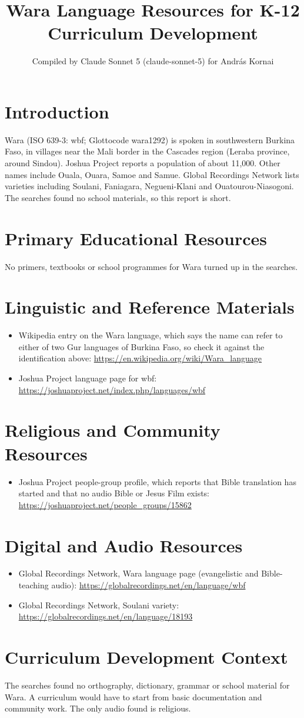 \documentclass[12pt]{article}
\title{Wara Language Resources for K-12 Curriculum Development}
\author{Compiled by Claude Sonnet 5 (claude-sonnet-5) for Andr\'as Kornai}
\date{}
\begin{document}
\maketitle

\section{Introduction}
Wara (ISO 639-3: wbf; Glottocode wara1292) is spoken in southwestern Burkina Faso, in villages near the Mali border in the Cascades region (Leraba province, around Sindou). Joshua Project reports a population of about 11,000. Other names include Ouala, Ouara, Samoe and Samue. Global Recordings Network lists varieties including Soulani, Faniagara, Negueni-Klani and Ouatourou-Niasogoni. The searches found no school materials, so this report is short.

\section{Primary Educational Resources}
No primers, textbooks or school programmes for Wara turned up in the searches.

\section{Linguistic and Reference Materials}
\begin{itemize}
\item Wikipedia entry on the Wara language, which says the name can refer to either of two Gur languages of Burkina Faso, so check it against the identification above: \url{https://en.wikipedia.org/wiki/Wara_language}
\item Joshua Project language page for wbf: \url{https://joshuaproject.net/index.php/languages/wbf}
\end{itemize}

\section{Religious and Community Resources}
\begin{itemize}
\item Joshua Project people-group profile, which reports that Bible translation has started and that no audio Bible or Jesus Film exists: \url{https://joshuaproject.net/people_groups/15862}
\end{itemize}

\section{Digital and Audio Resources}
\begin{itemize}
\item Global Recordings Network, Wara language page (evangelistic and Bible-teaching audio): \url{https://globalrecordings.net/en/language/wbf}
\item Global Recordings Network, Soulani variety: \url{https://globalrecordings.net/en/language/18193}
\end{itemize}

\section{Curriculum Development Context}
The searches found no orthography, dictionary, grammar or school material for Wara. A curriculum would have to start from basic documentation and community work. The only audio found is religious.
\end{document}
